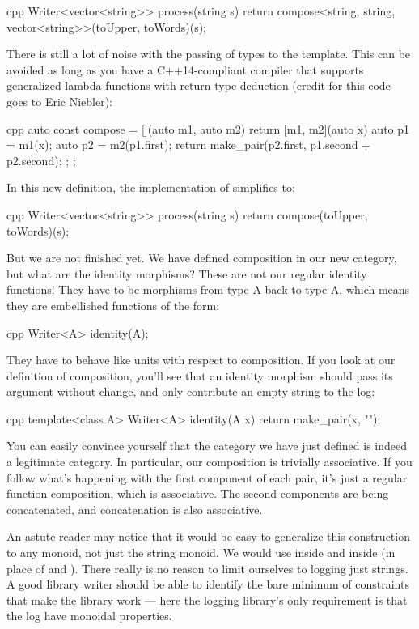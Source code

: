 \begin{snip}{cpp}
Writer<vector<string>> process(string s) { 
    return compose<string, string, vector<string>>(toUpper, toWords)(s);
}
\end{snip}
There is still a lot of noise with the passing of types to the
 template. This can be avoided as long as you have a
C++14-compliant compiler that supports generalized lambda functions with
return type deduction (credit for this code goes to Eric Niebler):

\begin{snip}{cpp}
auto const compose = [](auto m1, auto m2) { 
    return [m1, m2](auto x) { 
        auto p1 = m1(x);
        auto p2 = m2(p1.first);
        return make_pair(p2.first, p1.second + p2.second);
    };
};
\end{snip}
In this new definition, the implementation of 
simplifies to:

\begin{snip}{cpp}
Writer<vector<string>> process(string s) {
    return compose(toUpper, toWords)(s);
}
\end{snip}
But we are not finished yet. We have defined composition in our new
category, but what are the identity morphisms? These are not our regular
identity functions! They have to be morphisms from type A back to type
A, which means they are embellished functions of the form:

\begin{snip}{cpp}
Writer<A> identity(A);
\end{snip}
They have to behave like units with respect to composition. If you look
at our definition of composition, you'll see that an identity morphism
should pass its argument without change, and only contribute an empty
string to the log:

\begin{snip}{cpp}
template<class A> Writer<A> identity(A x) {
    return make_pair(x, "");
}
\end{snip}
You can easily convince yourself that the category we have just defined
is indeed a legitimate category. In particular, our composition is
trivially associative. If you follow what's happening with the first
component of each pair, it's just a regular function composition, which
is associative. The second components are being concatenated, and
concatenation is also associative.

An astute reader may notice that it would be easy to generalize this
construction to any monoid, not just the string monoid. We would use
 inside  and  inside
 (in place of \code{+} and ). There really
is no reason to limit ourselves to logging just strings. A good library
writer should be able to identify the bare minimum of constraints that
make the library work --- here the logging library's only requirement is
that the log have monoidal properties.


